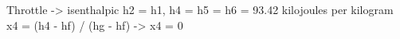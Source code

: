 Throttle -> isenthalpic  
h2 = h1, h4 = h5 = h6 = 93.42 kilojoules per kilogram  
x4 = (h4 - hf) / (hg - hf) -> x4 = 0